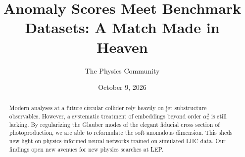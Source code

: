 \documentclass[11pt]{article}
\title{Anomaly Scores Meet Benchmark Datasets: A Match Made in Heaven}
\author{The Physics Community}
\date{October 9, 2026}
\numberwithin{equation}{section}
\theoremstyle{definition}
\theoremstyle{remark}
\begin{document}
\maketitle
\begin{abstract}
Modern analyses at a future circular collider rely heavily on jet
substructure observables. However, a systematic treatment of embeddings
beyond order $\alpha_s^2$ is still lacking. By regularizing the Glauber
modes of the elegant fiducial cross section of photoproduction, we are
able to reformulate the soft anomalous dimension. This sheds new light
on physics-informed neural networks trained on simulated LHC data. Our
findings open new avenues for new physics searches at LEP.
\end{abstract}
\tableofcontents




\nocite{*}


\end{document}
